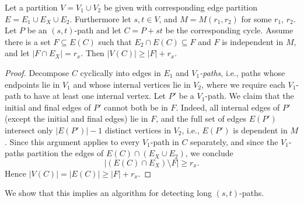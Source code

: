\documentclass{theoretics}
\begin{document}
\begin{lemma} \label{lemma:long-cycle-rank}
  Let a partition $V=V_1 \cup V_2$ be given with corresponding edge
  partition $E=E_1 \cup E_X \cup E_2$. Furthermore let $s, t \in V$,
  and $M=M(r_1,r_2)$ for some $r_1$, $r_2$.  
  Let $P$ be an $(s,t)$-path and let $C=P+st$ be the corresponding cycle.
  Assume there is a set $F \subseteq E(C)$ such that $E_2 \cap E(C) \subseteq F$
  and $F$ is independent in $M$, and let $|F \cap E_X|=r_x$. 
  Then $|V(C)| \geq |F|+r_x$. 
\end{lemma}
\begin{proof}
  Decompose $C$ cyclically into edges in $E_1$ and \emph{$V_1$-paths},
  i.e., paths whose endpoints lie in $V_1$ and whose internal vertices lie
  in $V_2$, where we require each $V_1$-path to have at least one
  internal vertex. Let $P'$ be a $V_1$-path. We claim that the initial and final
  edges of $P'$ cannot both be in $F$. Indeed, all internal edges of
  $P'$ (except the initial and final edges) lie in $F$, and the full
  set of edges $E(P')$ intersect only $|E(P')|-1$ distinct vertices in
  $V_2$, i.e., $E(P')$ is dependent in $M$. Since this argument applies
  to every $V_1$-path in $C$ separately, and since the $V_1$-paths partition
  the edges of $E(C) \cap (E_X \cup E_2)$, we conclude
  \[
    |(E(C) \cap E_X) \setminus F| \geq r_x.
  \]
  Hence $|V(C)|=|E(C)| \geq |F|+r_x$.
\end{proof}

We show that this implies an algorithm for detecting long $(s,t)$-paths.
\end{document}

